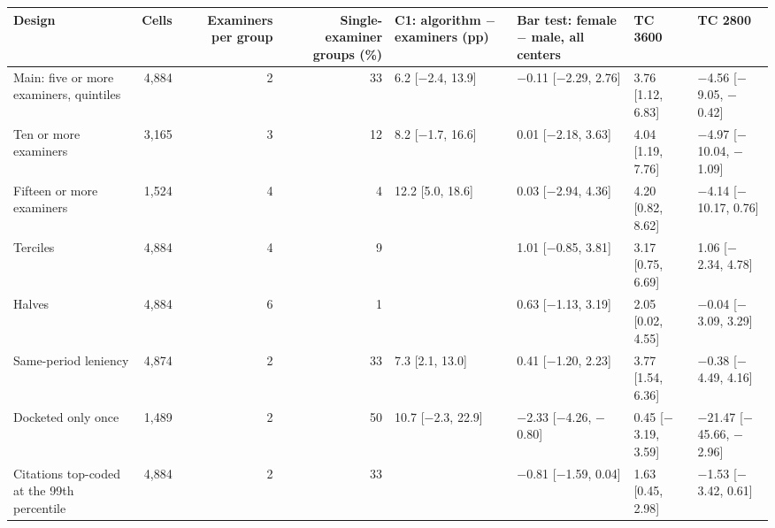 \begin{tabular}{lrrrllll}
\toprule
Design & Cells & Examiners per group & Single-examiner groups (\%) & C1: algorithm $-$ examiners (pp) & Bar test: female $-$ male, all centers & TC 3600 & TC 2800 \\
\midrule
Main: five or more examiners, quintiles & 4,884 & 2 & 33 & 6.2 [$-$2.4, 13.9] & $-$0.11 [$-$2.29, 2.76] & 3.76 [1.12, 6.83] & $-$4.56 [$-$9.05, $-$0.42] \\
Ten or more examiners & 3,165 & 3 & 12 & 8.2 [$-$1.7, 16.6] & 0.01 [$-$2.18, 3.63] & 4.04 [1.19, 7.76] & $-$4.97 [$-$10.04, $-$1.09] \\
Fifteen or more examiners & 1,524 & 4 & 4 & 12.2 [5.0, 18.6] & 0.03 [$-$2.94, 4.36] & 4.20 [0.82, 8.62] & $-$4.14 [$-$10.17, 0.76] \\
Terciles & 4,884 & 4 & 9 &  & 1.01 [$-$0.85, 3.81] & 3.17 [0.75, 6.69] & 1.06 [$-$2.34, 4.78] \\
Halves & 4,884 & 6 & 1 &  & 0.63 [$-$1.13, 3.19] & 2.05 [0.02, 4.55] & $-$0.04 [$-$3.09, 3.29] \\
Same-period leniency & 4,874 & 2 & 33 & 7.3 [2.1, 13.0] & 0.41 [$-$1.20, 2.23] & 3.77 [1.54, 6.36] & $-$0.38 [$-$4.49, 4.16] \\
Docketed only once & 1,489 & 2 & 50 & 10.7 [$-$2.3, 22.9] & $-$2.33 [$-$4.26, $-$0.80] & 0.45 [$-$3.19, 3.59] & $-$21.47 [$-$45.66, $-$2.96] \\
Citations top-coded at the 99th percentile & 4,884 & 2 & 33 &  & $-$0.81 [$-$1.59, 0.04] & 1.63 [0.45, 2.98] & $-$1.53 [$-$3.42, 0.61] \\
\bottomrule
\end{tabular}
